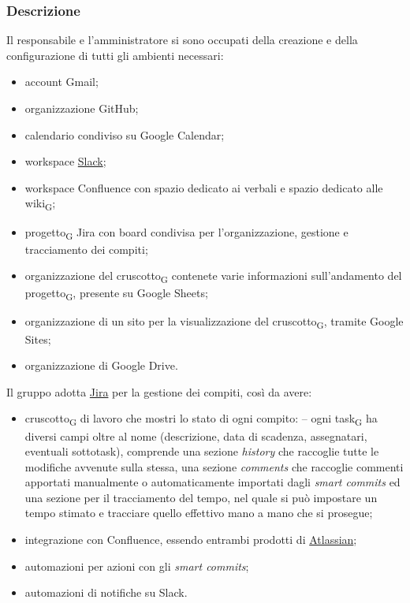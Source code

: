     \subsubsection{Descrizione}
    Il responsabile e l'amministratore si sono occupati della creazione e della configurazione di tutti gli ambienti necessari:
    \begin{itemize}
        \item account Gmail;
        \item organizzazione GitHub;
        \item calendario condiviso su Google Calendar;
        \item workspace \href{https://slack.com/intl/en-it/about}{Slack};
        \item workspace Confluence con spazio dedicato ai verbali e spazio dedicato alle wiki\textsubscript{G};
        \item progetto\textsubscript{G} Jira con board condivisa per l'organizzazione, gestione e tracciamento dei compiti;
        \item organizzazione del cruscotto\textsubscript{G} contenete varie informazioni sull'andamento del progetto\textsubscript{G}, presente su Google Sheets;
        \item organizzazione di un sito per la visualizzazione del cruscotto\textsubscript{G}, tramite Google Sites;
        \item organizzazione di Google Drive.
    \end{itemize}
        Il gruppo adotta \href{https://www.atlassian.com/software/jira}{Jira} per la gestione dei compiti, così da avere:
        \begin{itemize}
            \item cruscotto\textsubscript{G} di lavoro che mostri lo stato di ogni compito:
                \subitem -- ogni task\textsubscript{G} ha diversi campi oltre al nome (descrizione, data di scadenza, assegnatari, eventuali sottotask), comprende una sezione \textit{history} che raccoglie tutte le modifiche avvenute sulla stessa, una sezione \textit{comments} che raccoglie commenti apportati manualmente o automaticamente importati dagli \textit{smart commits} ed una sezione per il tracciamento del tempo, nel quale si può impostare un tempo stimato e tracciare quello effettivo mano a mano che si prosegue;
            \item integrazione con Confluence, essendo entrambi prodotti di \href{https://www.atlassian.com/}{Atlassian};
            \item automazioni per azioni con gli \textit{smart commits};
            \item automazioni di notifiche su Slack.
        \end{itemize}
